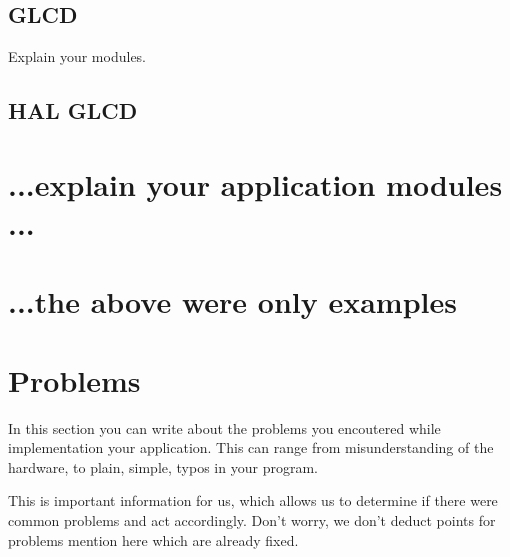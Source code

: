 \documentclass[12pt,a4paper,titlepage,oneside]{article}
\begin{document}
\subsection{GLCD}

Explain your modules.

\subsection{HAL GLCD}



\section{...explain your application modules ...}

\section{...the above were only examples}



\section{Problems}

In this section you can write about the problems you encoutered while
	implementation your application.
This can range from misunderstanding of the hardware, to plain, simple, typos
	in your program.

This is important information for us, which allows us to determine if there
	were common problems and act accordingly.
Don't worry, we don't deduct points for problems mention here which are
	already fixed.


\end{document}
